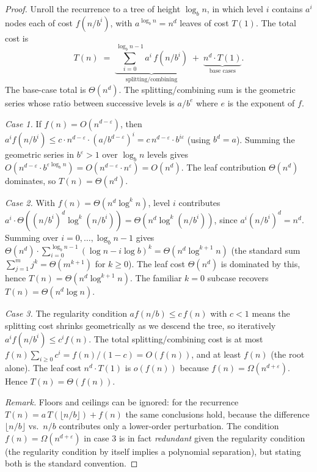 \begin{proof}
\sketchproof Unroll the recurrence to a tree of height $\log_b n$, in which level $i$ contains $a^i$ nodes each of cost $f(n/b^i)$, with $a^{\log_b n} = n^d$ leaves of cost $T(1)$. The total cost is
\[
  T(n) \;=\; \underbrace{\sum_{i=0}^{\log_b n - 1} a^i\,f(n/b^i)}_{\text{splitting/combining}}
  \;+\; \underbrace{n^d \cdot T(1)}_{\text{base cases}}.
\]
The base-case total is $\Theta(n^d)$. The splitting/combining sum is the geometric series whose ratio between successive levels is $a / b^{e}$ where $e$ is the exponent of $f$.

\emph{Case 1.} If $f(n) = O(n^{d - \varepsilon})$, then $a^i f(n/b^i) \le c \cdot n^{d-\varepsilon} \cdot (a/b^{d-\varepsilon})^i = c\,n^{d-\varepsilon} \cdot b^{i\varepsilon}$ (using $b^d = a$). Summing the geometric series in $b^\varepsilon > 1$ over $\log_b n$ levels gives $O(n^{d-\varepsilon} \cdot b^{\varepsilon \log_b n}) = O(n^{d-\varepsilon} \cdot n^\varepsilon) = O(n^d)$. The leaf contribution $\Theta(n^d)$ dominates, so $T(n) = \Theta(n^d)$.

\emph{Case 2.} With $f(n) = \Theta(n^d \log^k n)$, level $i$ contributes $a^i \cdot \Theta((n/b^i)^d \log^k(n/b^i)) = \Theta(n^d \log^k(n/b^i))$, since $a^i (n/b^i)^d = n^d$. Summing over $i = 0, \dots, \log_b n - 1$ gives $\Theta(n^d) \cdot \sum_{i=0}^{\log_b n - 1} (\log n - i \log b)^k = \Theta(n^d \log^{k+1} n)$ (the standard sum $\sum_{j=1}^{m} j^k = \Theta(m^{k+1})$ for $k \ge 0$). The leaf cost $\Theta(n^d)$ is dominated by this, hence $T(n) = \Theta(n^d \log^{k+1} n)$. The familiar $k = 0$ subcase recovers $T(n) = \Theta(n^d \log n)$.

\emph{Case 3.} The regularity condition $af(n/b) \le c\,f(n)$ with $c < 1$ means the splitting cost shrinks geometrically as we descend the tree, so iteratively $a^i f(n/b^i) \le c^i f(n)$. The total splitting/combining cost is at most $f(n) \sum_{i \ge 0} c^i = f(n)/(1-c) = O(f(n))$, and at least $f(n)$ (the root alone). The leaf cost $n^d \cdot T(1)$ is $o(f(n))$ because $f(n) = \Omega(n^{d+\varepsilon})$. Hence $T(n) = \Theta(f(n))$.

\medskip
\noindent\textit{Remark.} Floors and ceilings can be ignored: for the recurrence $T(n) = a\,T(\lfloor n/b \rfloor) + f(n)$ the same conclusions hold, because the difference $\lfloor n/b \rfloor$ vs.\ $n/b$ contributes only a lower-order perturbation. The condition $f(n) = \Omega(n^{d+\varepsilon})$ in case 3 is in fact \emph{redundant} given the regularity condition (the regularity condition by itself implies a polynomial separation), but stating both is the standard convention.
\end{proof}

